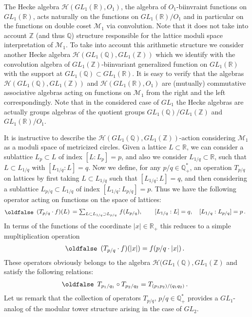 \documentclass[12pt]{article}
\def\IQ{\mathbb{Q}}
\def\IR{\mathbb{R}}
\def\IZ{\mathbb{Z}}
\def\CH {\mathcal{H}}
\def\CM {\mathcal{M}}
\def\be{\begin{eqnarray}\new\begin{array}{cc}}
\def\ee{\end{array}\end{eqnarray}}
\newcounter{pac}[section]
\begin{document}
The Hecke algebra $\CH(GL_1(\IR),O_1)$,
the  algebra of $O_1$-biinvraint functions on $GL_1(\IR)$,  acts naturally
on the functions on $GL_1(\IR)/O_1$   and in particular
on the functions on double coset $\CM_1$ via convolution.   Note that
it  does not take into account $\IZ$ (and thus $\IQ$) structure
responsible for the lattice moduli space interpretation of $\CM_1$. To
take into account this arithmetic structure we consider another Hecke
algebra $\CH(GL_1(\IQ),GL_1(\IZ))$ which we identify with the
convolution algebra of
$GL_1(\IZ)$-biinvariant generalized function on $GL_1(\IR)$ with the support at
$GL_1(\IQ)\subset GL_1(\IR)$. It is easy to verify that the algebras
$\CH(GL_1(\IQ),GL_1(\IZ))$ and $\CH(GL_1(\IR),O_1)$
 are (mutually) commutative associative algebras acting on
functions on $\CM_1$ from the right and the left
correspondingly. Note that in the considered case of $GL_1$ the Hecke algebras are
actually groups algebras of the quotient groups $GL_1(\IQ)/GL_1(\IZ)$ and
$GL_1(\IR)/O_1$.

It is instructive to describe the $\CH(GL_1(\IQ),GL_1(\IZ))$-action
 considering $\CM_1$ as a  moduli space of
metricized circles. Given a lattice $L\subset\IR$, we can consider a
sublattice $L_p\subset L$ of index $[L:L_p]=p$, and also we consider
$L_{1/q}\subset\IR$, such that $L\subset L_{1/q}$ with
$[L_{1/q}:L]=q$. Now we define, for any
$p/q\in \IQ_+^*$, an operation $T_{p/q}$ on lattices by first taking
$L\subset L_{1/q}$ such that
$[L_{1/q}:L]=q$, and then considering a sublattice $L_{p/q}\subset
L_{1/q}$ of index $[L_{1/q}:L_{p/q}]=p$. Thus we have the following
operator acting on functions on the space of lattices:
  \be
   (T_{p/q}\cdot f)(L)\,
   =\sum_{L\subset L_{1/q}\supset L_{p/q} }\,f(L_{p/q}),
   \qquad
   [L_{1/q}:L]=q, \quad [L_{1/q}:L_{p/q}]=p\,.
  \ee
 In terms of the functions of the coordinate $|x|\in \IR_+$ this
reduces to a simple mupltiplication operation
 \be
  (T_{p/q}\cdot f)(|x|)=f(p/q\cdot |x|)\,.
 \ee
These operators obviously belongs to the algebra
$\CH(GL_1(\IQ),GL_1(\IZ)$ and satisfy the following relations:
 \be
  T_{p_1/q_1}\circ T_{p_2/q_2}=T_{(p_1p_2)/(q_1q_2)}\,.
 \ee
Let us remark that the collection of operators $T_{p/q},\,p/q\in\IQ^*_+$
provides a $GL_1$-analog of the modular tower structure arising in the case of
$GL_2$.
\end{document}
